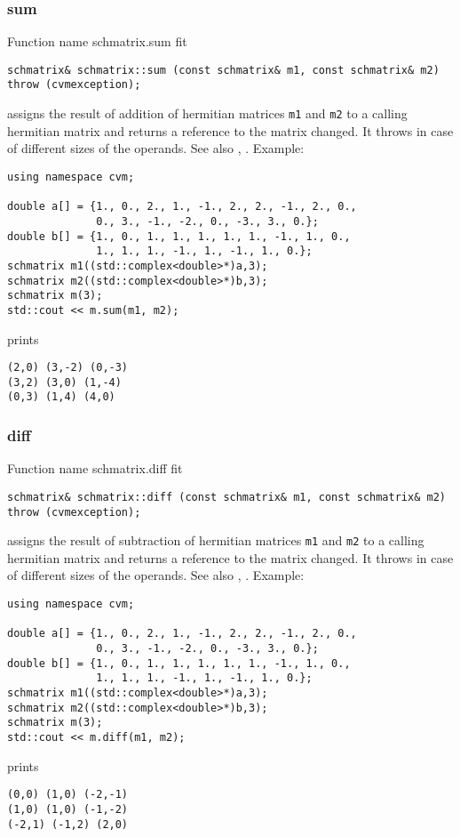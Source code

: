 \subsubsection{sum}
Function%
\pdfdest name {schmatrix.sum} fit
\begin{verbatim}
schmatrix& schmatrix::sum (const schmatrix& m1, const schmatrix& m2)
throw (cvmexception);
\end{verbatim}
assigns the result of addition of
hermitian matrices \verb"m1" and \verb"m2"  to a calling hermitian matrix
and returns a reference to
the matrix changed.
It throws  
in case of different sizes 
of the operands.
See also ,
.
Example:
\begin{Verbatim}
using namespace cvm;

double a[] = {1., 0., 2., 1., -1., 2., 2., -1., 2., 0.,
              0., 3., -1., -2., 0., -3., 3., 0.};
double b[] = {1., 0., 1., 1., 1., 1., 1., -1., 1., 0.,
              1., 1., 1., -1., 1., -1., 1., 0.};
schmatrix m1((std::complex<double>*)a,3);
schmatrix m2((std::complex<double>*)b,3);
schmatrix m(3);
std::cout << m.sum(m1, m2);
\end{Verbatim}
prints
\begin{Verbatim}
(2,0) (3,-2) (0,-3)
(3,2) (3,0) (1,-4)
(0,3) (1,4) (4,0)
\end{Verbatim}
\newpage




\subsubsection{diff}
Function%
\pdfdest name {schmatrix.diff} fit
\begin{verbatim}
schmatrix& schmatrix::diff (const schmatrix& m1, const schmatrix& m2)
throw (cvmexception);
\end{verbatim}
assigns the result of subtraction of
hermitian matrices \verb"m1" and \verb"m2" to a calling hermitian matrix
and returns a reference to
the matrix changed.
It throws  
in case of different sizes 
of the operands.
See also ,
.
Example:
\begin{Verbatim}
using namespace cvm;

double a[] = {1., 0., 2., 1., -1., 2., 2., -1., 2., 0.,
              0., 3., -1., -2., 0., -3., 3., 0.};
double b[] = {1., 0., 1., 1., 1., 1., 1., -1., 1., 0.,
              1., 1., 1., -1., 1., -1., 1., 0.};
schmatrix m1((std::complex<double>*)a,3);
schmatrix m2((std::complex<double>*)b,3);
schmatrix m(3);
std::cout << m.diff(m1, m2);
\end{Verbatim}
prints
\begin{Verbatim}
(0,0) (1,0) (-2,-1)
(1,0) (1,0) (-1,-2)
(-2,1) (-1,2) (2,0)
\end{Verbatim}
\newpage




